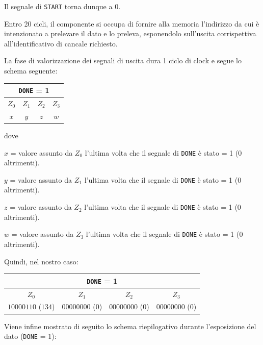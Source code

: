 \documentclass[a4paper,11pt]{article} %
\begin{document}
    Il segnale di \texttt{START} torna dunque a $0$.

    Entro 20 cicli, il componente si occupa di fornire alla memoria l'indirizzo da cui è intenzionato a prelevare il dato e lo preleva, esponendolo sull'uscita corrispettiva
    all'identificativo di cancale richiesto.

    La fase di valorizzazione dei segnali di uscita dura 1 ciclo di clock e segue lo schema seguente:

    \medskip

    \begin{tabular}{|c|c|c|c|}
        \hline
        \multicolumn{4}{|c|}{\texttt{DONE} = 1} \\
        \hline
        $Z_0$ & $Z_1$ & $Z_2$ & $Z_3$ \\
        \hline
        $x$   & $y$   & $z$   & $w$   \\
        \hline
    \end{tabular}

    \medskip

    dove

    $x$ = valore assunto da $Z_0$ l'ultima volta che il segnale di \texttt{DONE} è stato = 1 (0 altrimenti).

    $y$ = valore assunto da $Z_1$ l'ultima volta che il segnale di \texttt{DONE} è stato = 1 (0 altrimenti).

    $z$ = valore assunto da $Z_2$ l'ultima volta che il segnale di \texttt{DONE} è stato = 1 (0 altrimenti).

    $w$ = valore assunto da $Z_3$ l'ultima volta che il segnale di \texttt{DONE} è stato = 1 (0 altrimenti).

    \medskip

    Quindi, nel nostro caso:

    \medskip

    \begin{tabular}{|c|c|c|c|}
        \hline
        \multicolumn{4}{|c|}{\texttt{DONE} = 1} \\
        \hline
        $Z_0$              & $Z_1$          & $Z_2$          & $Z_3$          \\
        \hline
        $10000110$ ($134$) & $00000000$ (0) & $00000000$ (0) & $00000000$ (0) \\
        \hline
    \end{tabular}

    \bigskip

    Viene infine mostrato di seguito lo schema riepilogativo durante l'esposizione del dato (\texttt{DONE} = 1):
\end{document}
